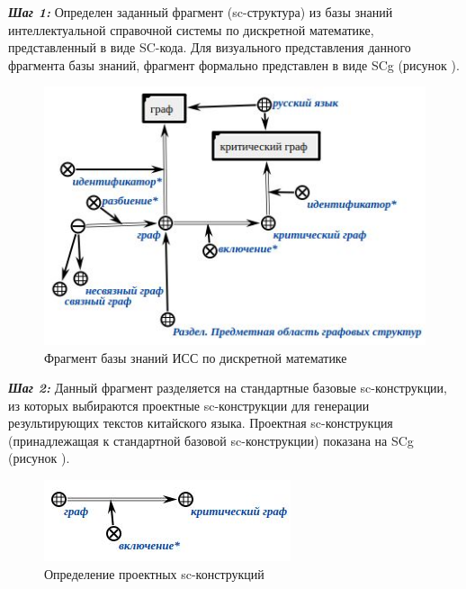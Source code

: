 \textbf{\textit{Шаг 1:}} Определен заданный фрагмент (sc-структура) из базы знаний интеллектуальной справочной системы по дискретной математике, представленный в виде SC-кода. Для визуального представления данного фрагмента базы знаний, фрагмент формально представлен в виде SCg (рисунок \textit{}).
\begin{figure}[H]
	\centering
	\includegraphics[scale=0.7]{images/part4/chapter_chinese/fragment_knowledge_base.png}
	\caption{Фрагмент базы знаний ИСС по дискретной математике}
	\label{fig:knowledge-base-fragment}
\end{figure}

\textbf{\textit{Шаг 2:}} Данный фрагмент разделяется на стандартные базовые sc-конструкции, из которых выбираются проектные sc-конструкции для генерации результирующих текстов китайского языка. Проектная sc-конструкция (принадлежащая к стандартной базовой sc-конструкции) показана на SCg (рисунок \textit{}).
\begin{figure}[H]
	\centering
	\includegraphics[scale=0.8]{images/part4/chapter_chinese/candidate_sc_structure.png}
	\caption{Определение проектных sc-конструкций}
	\label{fig:candidate-sc-construction}
\end{figure}

